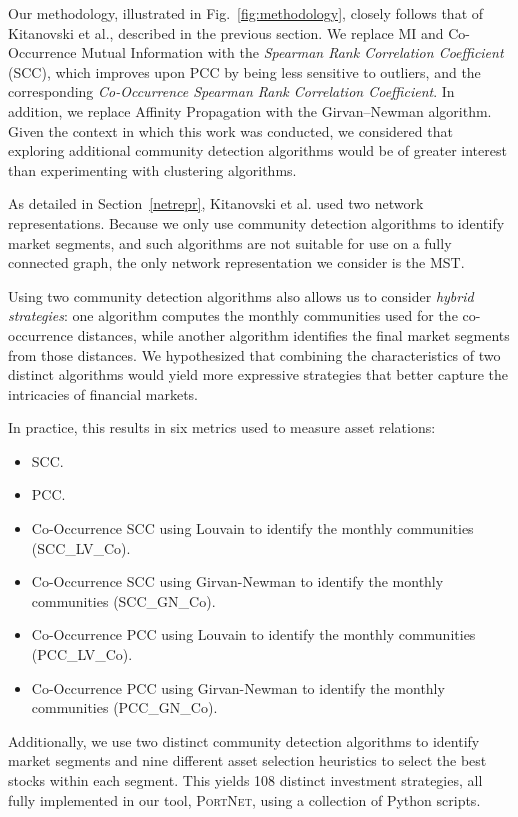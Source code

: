 \documentclass[acmsmall,screen,nonacm]{acmart}
\begin{document}
Our methodology, illustrated in Fig.~\ref{fig:methodology}, closely follows that of Kitanovski et al., described in the previous section.
We replace MI and Co-Occurrence Mutual Information with the \emph{Spearman Rank Correlation Coefficient} (SCC), which improves upon PCC by being less sensitive to outliers, and the corresponding \emph{Co-Occurrence Spearman Rank Correlation Coefficient}.
In addition, we replace Affinity Propagation with the Girvan–Newman algorithm.
Given the context in which this work was conducted, we considered that exploring additional community detection algorithms would be of greater interest than experimenting with clustering algorithms.

As detailed in Section~\ref{netrepr}, Kitanovski et al. used two network representations.
Because we only use community detection algorithms to identify market segments, and such algorithms are not suitable for use on a fully connected graph, the only network representation we consider is the MST.

Using two community detection algorithms also allows us to consider \emph{hybrid strategies}: one algorithm computes the monthly communities used for the co-occurrence distances, while another algorithm identifies the final market segments from those distances.
We hypothesized that combining the characteristics of two distinct algorithms would yield more expressive strategies that better capture the intricacies of financial markets.

In practice, this results in six metrics used to measure asset relations:
\begin{itemize}
    \item SCC.
    \item PCC.
    \item Co-Occurrence SCC using Louvain to identify the monthly communities (SCC\_LV\_Co).
    \item Co-Occurrence SCC using Girvan-Newman to identify the monthly communities (SCC\_GN\_Co).
    \item Co-Occurrence PCC using Louvain to identify the monthly communities (PCC\_LV\_Co).
    \item Co-Occurrence PCC using Girvan-Newman to identify the monthly communities (PCC\_GN\_Co).
\end{itemize}
Additionally, we use two distinct community detection algorithms to identify market segments and nine different asset selection heuristics to select the best stocks within each segment.
This yields 108 distinct investment strategies, all fully implemented in our tool, \textsc{PortNet}, using a collection of Python scripts.
\end{document}
